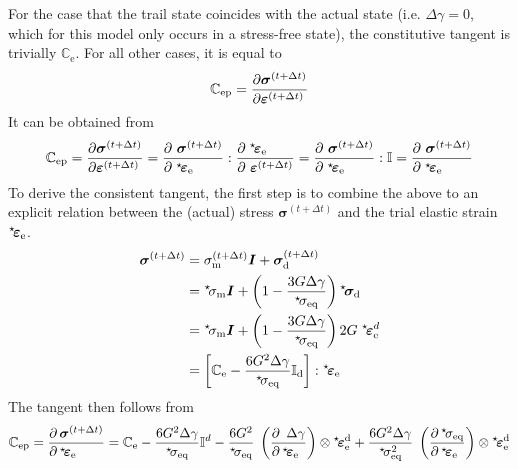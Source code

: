 \documentclass[times,namecite]{goose-article}
\newcommand\leftstar[1]{\hspace*{-.3em}~^\star\!#1}
\begin{document}
For the case that the trail state coincides with the actual state (i.e. $\Delta \gamma = 0$, which for this model only occurs in a stress-free state), the constitutive tangent is trivially $\mathbb{C}_\mathrm{e}$. For all other cases, it is equal to
\begin{equation}
  \mathbb{C}_\mathrm{ep}
  =
  \frac{
    \partial  \bm{\sigma}^{(t+\Delta t)} \hfill
  }{
    \partial \bm{\varepsilon}^{(t+\Delta t)} \hfill
  }
\end{equation}
It can be obtained from
\begin{equation}
  \mathbb{C}_\mathrm{ep}
  =
  \frac{
    \partial  \bm{\sigma}^{(t+\Delta t)} \hfill
  }{
    \partial \bm{\varepsilon}^{(t+\Delta t)} \hfill
  }
  =
  \frac{
    \partial ~\bm{\sigma}^{(t+\Delta t)} \hfill
  }{
    \partial \;\leftstar{\bm{\varepsilon}}_\mathrm{e} \hfill
  }
  :
  \frac{
    \partial \;\leftstar{\bm{\varepsilon}}_\mathrm{e} \hfill
  }{
    \partial ~\bm{\varepsilon}^{(t+\Delta t)}
  }
  =
  \frac{
    \partial ~\bm{\sigma}^{(t+\Delta t)} \hfill
  }{
    \partial \;\leftstar{\bm{\varepsilon}}_\mathrm{e} \hfill
  }
  :
  \mathbb{I}
  =
  \frac{
    \partial ~\bm{\sigma}^{(t+\Delta t)} \hfill
  }{
    \partial \;\leftstar{\bm{\varepsilon}}_\mathrm{e} \hfill
  }
\end{equation}
To derive the consistent tangent, the first step is to combine the above to an explicit relation between the (actual) stress $\bm{\sigma}^{(t+\Delta t)}$ and the trial elastic strain $\leftstar{\bm{\varepsilon}}_\mathrm{e}$.
\begin{align}
  \bm{\sigma}^{(t+\Delta t)}
  &= \sigma_\mathrm{m}^{(t+\Delta t)} \bm{I} + \bm{\sigma}_\mathrm{d}^{(t+\Delta t)}
  \\
  &= \leftstar{\sigma}_\mathrm{m} \bm{I} +
  \left( 1 - \frac{3 G \Delta \gamma}{\leftstar{\sigma}_\mathrm{eq}} \right) \leftstar{\bm{\sigma}}_\mathrm{d}
  \\
  &= \leftstar{\sigma}_\mathrm{m} \bm{I} +
  \left( 1 - \frac{3 G \Delta \gamma}{\leftstar{\sigma}_\mathrm{eq}} \right) 2 G \; \leftstar{\bm{\varepsilon}}_\mathrm{e}^d
  \\
  \label{eq:tangent:stress-strain}
  &= \left[ \mathbb{C}_\mathrm{e} - \frac{6 G^2 \Delta \gamma}{\leftstar{\sigma}_\mathrm{eq}} \mathbb{I}_\mathrm{d} \right] : \leftstar{\bm{\varepsilon}}_\mathrm{e}
\end{align}
The tangent then follows from
\begin{equation}
\mathbb{C}_\mathrm{ep}
=
\frac{
  \partial \, \bm{\sigma}^{(t+\Delta t)} \hfill
}{
  \partial \, \leftstar{\bm{\varepsilon}}_\mathrm{e} \hfill
}
=
\mathbb{C}_\mathrm{e}
- \frac{6 G^2 \Delta \gamma}{\leftstar{\sigma}_\mathrm{eq}} \mathbb{I}^d
- \frac{6 G^2}{\leftstar{\sigma}_\mathrm{eq}} \;
\left( \frac{
  \partial \,~\Delta \gamma \hfill
}{
  \partial \,\leftstar{\bm{\varepsilon}}_\mathrm{e} \hfill
} \right) \otimes
\leftstar{\bm{\varepsilon}}_\mathrm{e}^\mathrm{d}
+ \frac{6 G^2 \Delta \gamma}{\leftstar{\sigma}_\mathrm{eq}^2} \;
\left( \frac{
  \partial \,\leftstar{\sigma}_\mathrm{eq} \hfill
}{
  \partial \,\leftstar{\bm{\varepsilon}}_\mathrm{e} \hfill
} \right) \otimes
\leftstar{\bm{\varepsilon}}_\mathrm{e}^\mathrm{d}
\end{equation}
\end{document}
